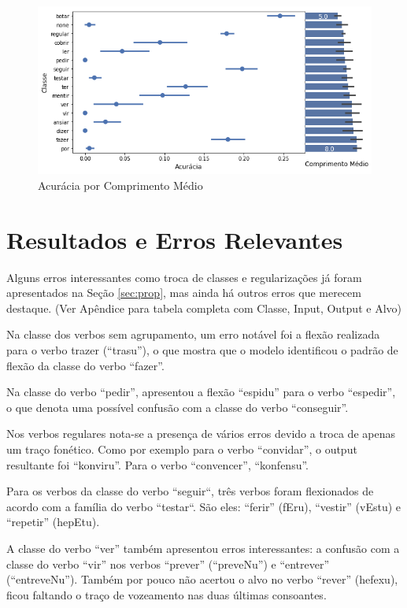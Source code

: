 \begin{figure}[H]
  \centering
  \includegraphics[width=0.8\linewidth]{img/comp_acc.png}
  \caption{Acurácia por Comprimento Médio}
  \label{fig:kfoldprop}
\end{figure}


\section{Resultados e Erros Relevantes}
\label{sec:interesting}

Alguns erros interessantes como troca de classes e regularizações já foram apresentados na Seção \ref{sec:prop}, mas ainda há outros erros que merecem destaque. (Ver Apêndice para tabela completa com Classe, Input, Output e Alvo)

Na classe dos verbos sem agrupamento, um erro notável foi a flexão realizada para o verbo trazer (“trasu”), o que mostra que o modelo identificou o padrão de flexão da classe do verbo “fazer”. 

Na classe do verbo “pedir”, apresentou a flexão “espidu” para o verbo “espedir”, o que denota uma possível confusão com a classe do verbo “conseguir”.

Nos verbos regulares nota-se a presença de vários erros devido a troca de apenas um traço fonético. Como por exemplo para o verbo “convidar”, o output resultante foi “konviru”. Para o verbo “convencer”, “konfensu”.

Para os verbos da classe do verbo “seguir“, três verbos foram flexionados de acordo com a família do verbo “testar“. São eles: “ferir” (fEru), “vestir” (vEstu) e “repetir” (hepEtu).

A classe do verbo “ver” também apresentou erros interessantes: a confusão com a classe do verbo “vir” nos verbos “prever” (“preveNu”) e “entrever” (“entreveNu”). Também por pouco não acertou o alvo no verbo “rever” (hefexu), ficou faltando o traço de vozeamento nas duas últimas consoantes.

